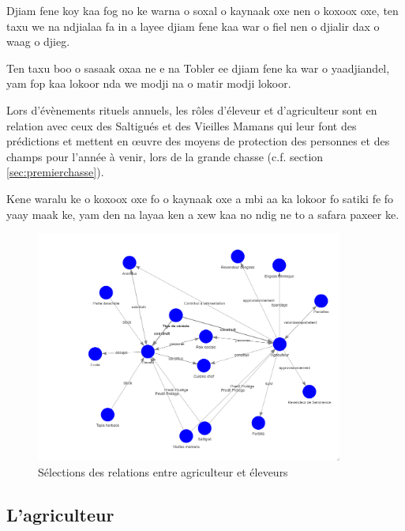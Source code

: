 \begin{paracol}{2}
\switchcolumn %

Djiam fene koy kaa fog no ke warna o soxal o kaynaak oxe nen o koxoox oxe, ten taxu we na ndjialaa fa in a layee djiam fene kaa war o fiel nen o djialir dax o waag o djieg.

Ten taxu boo o sasaak oxaa ne e na Tobler ee djiam fene ka war o yaadjiandel, yam fop kaa lokoor nda we modji na o matir modji lokoor.

\switchcolumn %

Lors d'évènements rituels annuels, les rôles d'éleveur et d'agriculteur sont en relation avec ceux des Saltigués et des Vieilles Mamans qui leur font des prédictions et mettent en œuvre des moyens de protection des personnes et des champs pour l'année à venir, lors de la grande chasse (c.f. section \ref{sec:premierchasse}).

\switchcolumn %

Kene waralu ke o koxoox oxe fo o kaynaak oxe a mbi aa ka lokoor fo satiki fe fo yaay maak ke, yam den na layaa ken a xew kaa no ndig ne to a safara paxeer ke.

\end{paracol}

\begin{figure}
  \begin{center}
    \includegraphics[width=0.9\textwidth]{img/agriculteur_eleveur.png}
  \end{center}
  \caption{Sélections des relations entre agriculteur et éleveurs}
  \label{fig:agripasteur}
\end{figure}

\subsection{L'agriculteur}

